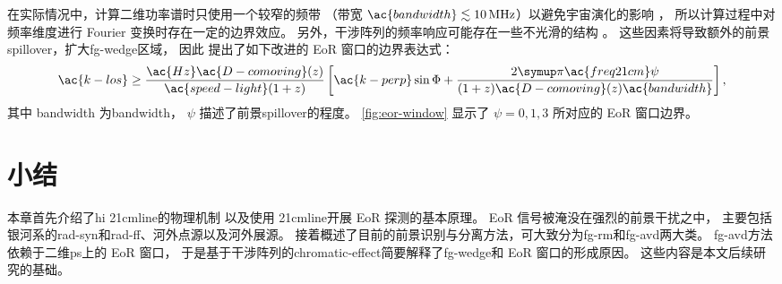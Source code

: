 在实际情况中，计算二维功率谱时只使用一个较窄的频带
（带宽 $\ac{bandwidth} \lesssim \SI{10}{\MHz}$）以避免宇宙演化的影响
\cite{wyithe2004,thyagarajan2013}，
所以计算过程中对频率维度进行 Fourier 变换时存在一定的边界效应。
另外，干涉阵列的频率响应可能存在一些不光滑的结构 \cite{deLeraAcedo2017,trott2017}。
这些因素将导致额外的前景\ac{spillover}，扩大\ac{fg-wedge}区域，
因此  提出了如下改进的 EoR 窗口的边界表达式：
\begin{equation}
  \label{eq:eor-window}
  \ac{k-los} \ge
    \frac{\ac{Hz} \ac{D-comoving}(z)}{\ac{speed-light} (1+z)}
    \left[ \ac{k-perp} \sin\Phi
      + \frac{2\Cpi\ac{freq21cm} \psi}{(1+z) \ac{D-comoving}(z)
        \ac{bandwidth}} \right] ,
\end{equation}
其中 \ac{bandwidth} 为\acl{bandwidth}，
$\psi$ 描述了前景\ac{spillover}的程度。
\autoref{fig:eor-window} 显示了 $\psi = 0, 1, 3$ 所对应的 EoR 窗口边界。


\section{小结}

本章首先介绍了\ac{hi} \ac{21cmline}的物理机制
以及使用 \ac{21cmline}开展 EoR 探测的基本原理。
EoR 信号被淹没在强烈的前景干扰之中，
主要包括银河系的\ac{rad-syn}和\ac{rad-ff}、河外点源以及河外展源。
接着概述了目前的前景识别与分离方法，可大致分为\ac{fg-rm}和\ac{fg-avd}两大类。
\ac{fg-avd}方法依赖于二维\ac{ps}上的 EoR 窗口，
于是基于干涉阵列的\ac{chromatic-effect}简要解释了\ac{fg-wedge}和
EoR 窗口的形成原因。
这些内容是本文后续研究的基础。


